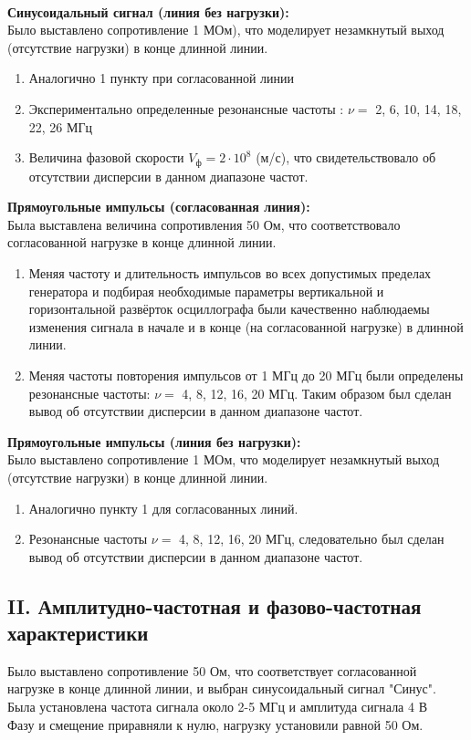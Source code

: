 \documentclass[a4paper,12pt]{article} %
\begin{document}
\paragraph{}
\textbf{Синусоидальный сигнал (линия без нагрузки):}\\
Было выставлено сопротивление 1 МОм), что моделирует незамкнутый выход
(отсутствие нагрузки) в конце длинной линии.
\begin{enumerate}
\item Аналогично 1 пункту при согласованной линии
\item  Экспериментально определенные резонансные частоты : $ \nu =  $ 2, 6, 10, 14, 18, 22, 26 МГц
\item Величина фазовой скорости $ V_\text{ф} = 2 \cdot 10^8  $ (м/с), что свидетельствовало об отсутствии дисперсии в данном диапазоне частот.
\end{enumerate}

\textbf{Прямоугольные импульсы (согласованная линия):}\\
Была выставлена величина сопротивления 50 Ом, что соответствовало согласованной нагрузке в
конце длинной линии.
\begin{enumerate}
\item Меняя частоту и длительность импульсов во всех допустимых пределах генератора и подбирая необходимые параметры вертикальной и горизонтальной развёрток
осциллографа были качественно наблюдаемы изменения сигнала в начале и в конце (на
согласованной нагрузке) в длинной линии.
\item Меняя частоты повторения импульсов от 1 МГц до 20 МГц были определены резонансные частоты: $\nu =  $ 4, 8, 12, 16, 20 МГц. Таким образом был сделан вывод об отсутствии дисперсии в данном диапазоне частот.
\end{enumerate}

\textbf{Прямоугольные импульсы (линия без нагрузки):} \\
Было выставлено сопротивление 1 МОм, что моделирует незамкнутый выход (отсутствие нагрузки) в конце длинной линии.
\begin{enumerate}
\item Аналогично пункту 1 для согласованных линий.
\item Резонансные частоты $\nu =  $ 4, 8, 12, 16, 20 МГц, следовательно был сделан вывод об отсутствии дисперсии в данном диапазоне частот.
\end{enumerate}

\subsection*{II. Амплитудно-частотная и фазово-частотная характеристики}
Было выставлено сопротивление 50 Ом, что соответствует согласованной нагрузке в
конце длинной линии, и выбран синусоидальный сигнал "Синус".\\
Была установлена частота сигнала около 2-5 МГц и амплитуда сигнала 4 В \\
Фазу и смещение приравняли к нулю, нагрузку установили равной 50 Ом.
\end{document}
